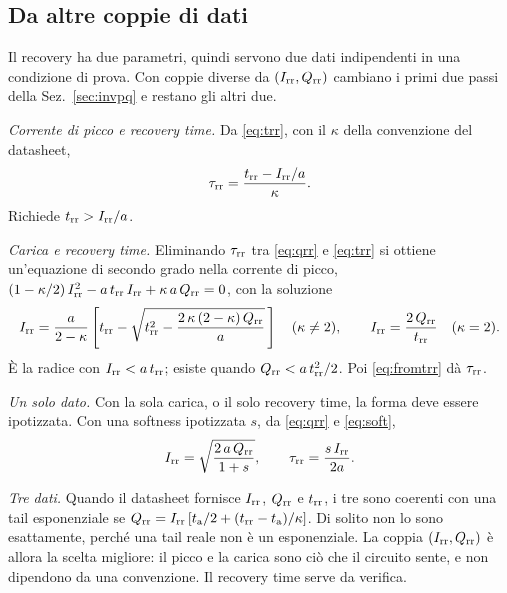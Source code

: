 \documentclass[10pt,a4paper]{scrartcl}
\let\newcommand\lmitdefine
\newcommand{\Irr}{I_\mathrm{rr}}
\newcommand{\Qrr}{Q_\mathrm{rr}}
\newcommand{\trr}{t_\mathrm{rr}}
\newcommand{\ta}{t_\mathrm{a}}
\newcommand{\taurr}{\tau_\mathrm{rr}}
\begin{document}
\subsection{Da altre coppie di dati}
\label{sec:pairs}
Il recovery ha due parametri, quindi servono due dati indipendenti in una condizione di prova. Con coppie diverse da $(\Irr, \Qrr)$ cambiano i primi due passi della Sez.~\ref{sec:invpq} e restano gli altri due.

\emph{Corrente di picco e recovery time.} Da \eqref{eq:trr}, con il $\kappa$ della convenzione del datasheet,
\begin{equation}
\taurr = \frac{\trr - \Irr/a}{\kappa} .
\label{eq:fromtrr}
\end{equation}
Richiede $\trr > \Irr/a$.

\emph{Carica e recovery time.} Eliminando $\taurr$ tra \eqref{eq:qrr} e \eqref{eq:trr} si ottiene un'equazione di secondo grado nella corrente di picco, $(1-\kappa/2)\,\Irr^2 - a\,\trr\,\Irr + \kappa\,a\,\Qrr = 0$, con la soluzione
\begin{equation}
\Irr = \frac{a}{2-\kappa}\left[\trr - \sqrt{\trr^2 - \frac{2\,\kappa\,(2-\kappa)\,\Qrr}{a}}\,\right] \quad (\kappa \neq 2) , \qquad \Irr = \frac{2\,\Qrr}{\trr} \quad (\kappa = 2) .
\label{eq:fromqt}
\end{equation}
È la radice con $\Irr < a\,\trr$; esiste quando $\Qrr < a\,\trr^2/2$. Poi \eqref{eq:fromtrr} dà $\taurr$.

\emph{Un solo dato.} Con la sola carica, o il solo recovery time, la forma deve essere ipotizzata. Con una softness ipotizzata $s$, da \eqref{eq:qrr} e \eqref{eq:soft},
\begin{equation}
\Irr = \sqrt{\frac{2\,a\,\Qrr}{1+s}} , \qquad \taurr = \frac{s\,\Irr}{2a} .
\label{eq:fromq}
\end{equation}

\emph{Tre dati.} Quando il datasheet fornisce $\Irr$, $\Qrr$ e $\trr$, i tre sono coerenti con una tail esponenziale se $\Qrr = \Irr\,[\ta/2 + (\trr-\ta)/\kappa]$. Di solito non lo sono esattamente, perché una tail reale non è un esponenziale. La coppia $(\Irr, \Qrr)$ è allora la scelta migliore: il picco e la carica sono ciò che il circuito sente, e non dipendono da una convenzione. Il recovery time serve da verifica.
\end{document}
